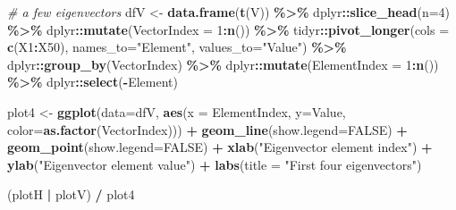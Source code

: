 \documentclass[
]{book}
\newenvironment{Shaded}{\begin{snugshade}}{\end{snugshade}}
\newcommand{\CommentTok}[1]{\textcolor[rgb]{0.56,0.35,0.01}{\textit{#1}}}
\newcommand{\DataTypeTok}[1]{\textcolor[rgb]{0.13,0.29,0.53}{#1}}
\newcommand{\DecValTok}[1]{\textcolor[rgb]{0.00,0.00,0.81}{#1}}
\newcommand{\KeywordTok}[1]{\textcolor[rgb]{0.13,0.29,0.53}{\textbf{#1}}}
\newcommand{\NormalTok}[1]{#1}
\newcommand{\OperatorTok}[1]{\textcolor[rgb]{0.81,0.36,0.00}{\textbf{#1}}}
\newcommand{\OtherTok}[1]{\textcolor[rgb]{0.56,0.35,0.01}{#1}}
\newcommand{\StringTok}[1]{\textcolor[rgb]{0.31,0.60,0.02}{#1}}
\begin{document}
\begin{Shaded}
\begin{Highlighting}[]
\CommentTok{\# a few eigenvectors}
\NormalTok{dfV \textless{}{-}}\StringTok{ }
\StringTok{  }\KeywordTok{data.frame}\NormalTok{(}\KeywordTok{t}\NormalTok{(V)) }\OperatorTok{\%\textgreater{}\%}
\StringTok{  }\NormalTok{dplyr}\OperatorTok{::}\KeywordTok{slice\_head}\NormalTok{(}\DataTypeTok{n=}\DecValTok{4}\NormalTok{) }\OperatorTok{\%\textgreater{}\%}
\StringTok{  }\NormalTok{dplyr}\OperatorTok{::}\KeywordTok{mutate}\NormalTok{(}\DataTypeTok{VectorIndex =} \DecValTok{1}\OperatorTok{:}\KeywordTok{n}\NormalTok{()) }\OperatorTok{\%\textgreater{}\%}
\StringTok{  }\NormalTok{tidyr}\OperatorTok{::}\KeywordTok{pivot\_longer}\NormalTok{(}\DataTypeTok{cols =} \KeywordTok{c}\NormalTok{(X1}\OperatorTok{:}\NormalTok{X50), }\DataTypeTok{names\_to=}\StringTok{"Element"}\NormalTok{, }\DataTypeTok{values\_to=}\StringTok{"Value"}\NormalTok{) }\OperatorTok{\%\textgreater{}\%}
\StringTok{  }\NormalTok{dplyr}\OperatorTok{::}\KeywordTok{group\_by}\NormalTok{(VectorIndex) }\OperatorTok{\%\textgreater{}\%}
\StringTok{  }\NormalTok{dplyr}\OperatorTok{::}\KeywordTok{mutate}\NormalTok{(}\DataTypeTok{ElementIndex =} \DecValTok{1}\OperatorTok{:}\KeywordTok{n}\NormalTok{()) }\OperatorTok{\%\textgreater{}\%}
\StringTok{  }\NormalTok{dplyr}\OperatorTok{::}\KeywordTok{select}\NormalTok{(}\OperatorTok{{-}}\NormalTok{Element)}

\NormalTok{plot4 \textless{}{-}}\StringTok{ }
\StringTok{  }\KeywordTok{ggplot}\NormalTok{(}\DataTypeTok{data=}\NormalTok{dfV, }\KeywordTok{aes}\NormalTok{(}\DataTypeTok{x =}\NormalTok{ ElementIndex, }\DataTypeTok{y=}\NormalTok{Value, }\DataTypeTok{color=}\KeywordTok{as.factor}\NormalTok{(VectorIndex))) }\OperatorTok{+}\StringTok{ }
\StringTok{  }\KeywordTok{geom\_line}\NormalTok{(}\DataTypeTok{show.legend=}\OtherTok{FALSE}\NormalTok{) }\OperatorTok{+}\StringTok{ }
\StringTok{  }\KeywordTok{geom\_point}\NormalTok{(}\DataTypeTok{show.legend=}\OtherTok{FALSE}\NormalTok{) }\OperatorTok{+}\StringTok{ }
\StringTok{  }\KeywordTok{xlab}\NormalTok{(}\StringTok{"Eigenvector element index"}\NormalTok{) }\OperatorTok{+}\StringTok{ }
\StringTok{  }\KeywordTok{ylab}\NormalTok{(}\StringTok{"Eigenvector element value"}\NormalTok{) }\OperatorTok{+}\StringTok{ }
\StringTok{  }\KeywordTok{labs}\NormalTok{(}\DataTypeTok{title =} \StringTok{"First four eigenvectors"}\NormalTok{)}

\NormalTok{(plotH }\OperatorTok{|}\StringTok{ }\NormalTok{plotV) }\OperatorTok{/}\StringTok{ }\NormalTok{plot4}
\end{Highlighting}
\end{Shaded}
\end{document}
